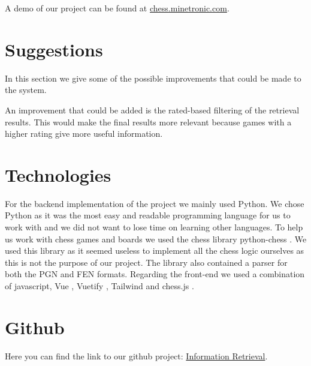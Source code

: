 \documentclass[11pt]{article}
\begin{document}
    A demo of our project can be found at \href{http://chess.minetronic.com}{chess.minetronic.com}.


    \section{Suggestions}

    In this section we give some of the possible improvements that could be made to the system.

    An improvement that could be added is the rated-based filtering of the retrieval results. This would make the final results more relevant because games with a higher rating give more useful information.


    \section{Technologies}

    For the backend implementation of the project we mainly used Python. We chose Python as it was the most easy and readable programming language for us to work with and we did not want to lose time on learning other languages. To help us work with chess games and boards we used the chess library python-chess \cite{python-chess}. We used this library as it seemed useless to implement all the chess logic ourselves as this is not the purpose of our project. The library also contained a parser for both the PGN and FEN formats. Regarding the front-end we used a combination of javascript, Vue \cite{Vue}, Vuetify \cite{Vuetify}, Tailwind \cite{Tailwindcss} and chess.js \cite{chess.js}.


    \section{Github}

    Here you can find the link to our github project: \href{https://github.com/RobMandelings/InformationRetrieval.git}{Information Retrieval}.

    

\end{document}
